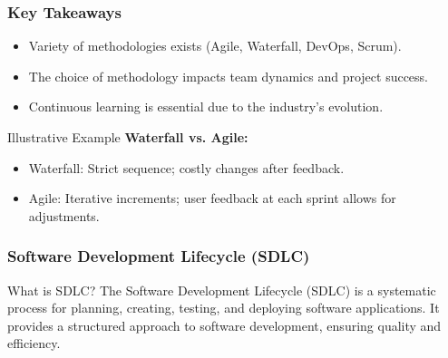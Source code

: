 \documentclass{beamer}
\begin{document}
\begin{frame}[fragile]
    \frametitle{Key Takeaways}
    \begin{itemize}
        \item Variety of methodologies exists (Agile, Waterfall, DevOps, Scrum).
        \item The choice of methodology impacts team dynamics and project success.
        \item Continuous learning is essential due to the industry's evolution.
    \end{itemize}
    
    \begin{block}{Illustrative Example}
        \textbf{Waterfall vs. Agile:}
        \begin{itemize}
            \item Waterfall: Strict sequence; costly changes after feedback.
            \item Agile: Iterative increments; user feedback at each sprint allows for adjustments.
        \end{itemize}
    \end{block}
\end{frame}

\begin{frame}[fragile]
    \frametitle{Software Development Lifecycle (SDLC)}
    \begin{block}{What is SDLC?}
        The Software Development Lifecycle (SDLC) is a systematic process for planning, creating, testing, and deploying software applications. It provides a structured approach to software development, ensuring quality and efficiency.
    \end{block}
\end{frame}
\end{document}
